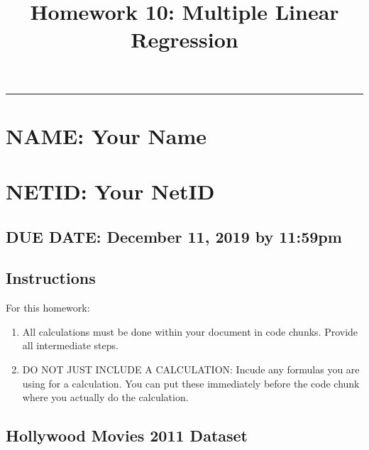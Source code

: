 \documentclass[]{article}
\title{Homework 10: Multiple Linear Regression}
\author{}
\date{}
\begin{document}
\maketitle

\begin{center}\rule{0.5\linewidth}{\linethickness}\end{center}

\hypertarget{name-your-name}{%
\section{NAME: Your Name}\label{name-your-name}}

\hypertarget{netid-your-netid}{%
\section{NETID: Your NetID}\label{netid-your-netid}}

\hypertarget{due-date-december-11-2019-by-1159pm}{%
\subsection{\texorpdfstring{\textbf{DUE DATE: December 11, 2019 by
11:59pm
}}{DUE DATE: December 11, 2019 by 11:59pm }}\label{due-date-december-11-2019-by-1159pm}}

\hypertarget{instructions}{%
\subsection{Instructions}\label{instructions}}

For this homework:

\begin{enumerate}
\def\labelenumi{\arabic{enumi}.}
\item
  All calculations must be done within your document in code chunks.
  Provide all intermediate steps.
\item
  DO NOT JUST INCLUDE A CALCULATION: Incude any formulas you are using
  for a calculation. You can put these immediately before the code chunk
  where you actually do the calculation.
\end{enumerate}

\hypertarget{hollywood-movies-2011-dataset}{%
\subsection{Hollywood Movies 2011
Dataset}\label{hollywood-movies-2011-dataset}}
\end{document}
